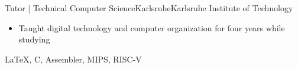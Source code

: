 {\begin{experiences}
        \experience
        {
        }   {Tutor | Technical Computer Science}{Karlsruhe}{Karlsruhe Institute of Technology}
        {
        } {
        \begin{itemize}
            \item Taught digital technology and computer organization for four years while studying
        \end{itemize}
        }
        {\LaTeX, C, Assembler, MIPS, RISC-V}
        \emptySeparator

\end{experiences}}
